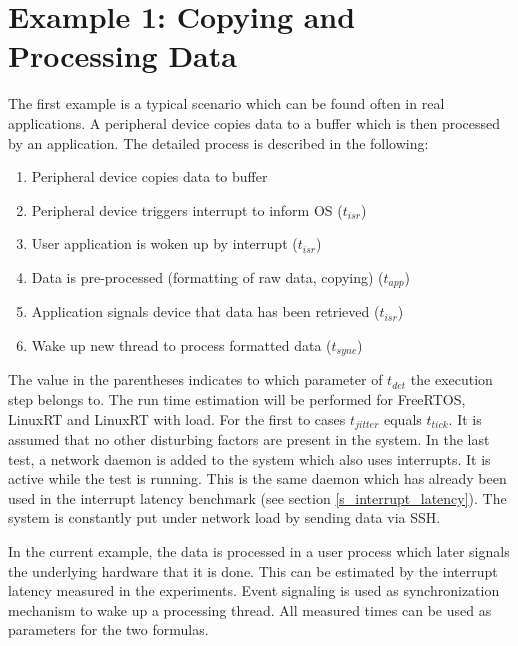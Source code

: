 \section{Example 1: Copying and Processing Data}\label{ss_example_1}
The first example is a typical scenario which can be found often in real applications. 
A peripheral device copies data to a buffer which is then processed by an application. 
The detailed process is described in the following:
\begin{enumerate}
	\item Peripheral device copies data to buffer
	\item	Peripheral device triggers interrupt to inform OS ($t_{isr}$)
	\item User application is woken up by interrupt ($t_{isr}$)
	\item Data is pre-processed (formatting of raw data, copying) ($t_{app}$)
	\item Application signals device that data has been retrieved ($t_{isr}$)
	\item Wake up new thread to process formatted data ($t_{sync}$)
\end{enumerate}
The value in the parentheses indicates to which parameter of $t_{det}$ the execution step belongs to.
The run time estimation will be performed for FreeRTOS, LinuxRT and LinuxRT with load.
For the first to cases $t_{jitter}$ equals $t_{tick}$.
It is assumed that no other disturbing factors are present in the system.
In the last test, a network daemon is added to the system which also uses interrupts.
It is active while the test is running. 
This is the same daemon which has already been used in the interrupt latency benchmark (see section \ref{s_interrupt_latency}). 
The system is constantly put under network load by sending data via \ac{SSH}.
\par
In the current example, the data is processed in a user process which later signals the underlying hardware that it is done. 
This can be estimated by the interrupt latency measured in the experiments. 
Event signaling is used as synchronization mechanism to wake up a processing thread.
All measured times can be used as parameters for the two formulas.

